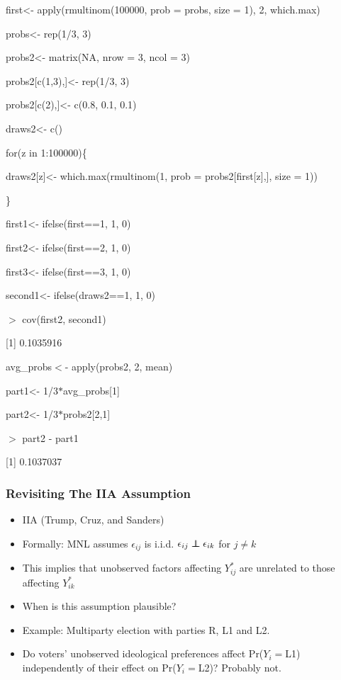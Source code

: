 \documentclass{beamer}
\newcommand\indep{\protect\mathpalette{\protect\independenT}{\perp}}
\def\independenT#1#2{\mathrel{\rlap{$#1#2$}\mkern2mu{#1#2}}}
\begin{document}
\begin{frame}

\footnotesize

\begin{semiverbatim}

first<- apply(rmultinom(100000, prob = probs, size = 1), 2, which.max)


probs<- rep(1/3, 3)

probs2<- matrix(NA, nrow = 3, ncol = 3)

probs2[c(1,3),]<- rep(1/3, 3)

probs2[c(2),]<- c(0.8, 0.1, 0.1)

draws2<- c()

for(z in 1:100000)\{

  draws2[z]<- which.max(rmultinom(1, prob = probs2[first[z],], size = 1))

  \}

first1<- ifelse(first==1, 1, 0)

first2<- ifelse(first==2, 1, 0)

first3<- ifelse(first==3, 1, 0)

second1<- ifelse(draws2==1, 1, 0)


$>$ cov(first2, second1)

[1] 0.1035916

avg\_probs$<$- apply(probs2, 2, mean)

part1<- 1/3$*$avg\_probs[1]

part2<- 1/3$*$probs2[2,1]

$>$ part2 - part1

[1] 0.1037037

 \end{semiverbatim}

\end{frame}






\begin{frame}
\frametitle{Revisiting The IIA Assumption}
\begin{itemize}
  \item IIA (Trump, Cruz, and Sanders)
\medskip
\pause
  \item Formally: MNL assumes $\epsilon_{ij}$ is i.i.d.  $\epsilon_{ij} \indep \epsilon_{ik}$ for $j\neq k$
\medskip
\pause
  \item This implies that unobserved factors affecting $Y_{ij}^\ast$
    are unrelated to those affecting $Y_{ik}^\ast$
\medskip
\pause
  \item When is this assumption plausible?
\pause
\bigskip
  \item Example: Multiparty election with parties R, L1 and L2.
\medskip
\pause
  \item Do voters' unobserved ideological preferences affect Pr($Y_i=$L1) independently
    of their effect on Pr($Y_i=$L2)? \pause Probably not.
\end{itemize}
\end{frame}
\end{document}
